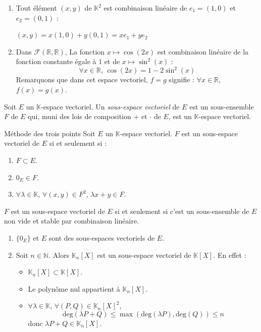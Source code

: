\documentclass[french,11pt,twoside]{VcCours}
\begin{document}
\begin{Exemples}
\begin{enumerate}
\item Tout élément $(x,y)$ de $\mathbb{K}^2$ est combinaison linéaire de $e_1=(1,0)$ et $e_2=(0,1)$ :

{$(x,y) = x(1,0)+ y(0,1)= xe_1 + y e_2$}
\item Dans $\mathcal{F}(\mathbb{R},\mathbb{R})$, La fonction $x \mapsto \cos(2x)$ est combinaison linéaire de la fonction constante égale à $1$ et de $x \mapsto \sin^2(x)$ :
$$ \forall x \in \mathbb{R}, \, \cos(2x) = 1 - 2 \sin^2(x)$$
Remarquons que dans cet espace vectoriel, $f=g$ signifie : $\forall x \in \mathbb{R}$, $f(x)=g(x)$.
\end{enumerate}
\end{Exemples}



\begin{Definition}{} Soit $E$ un $\mathbb{K}$-espace vectoriel. Un \emph{sous-espace vectoriel} de $E$ est un sous-ensemble $F$ de $E$ qui, muni  des lois de composition $+$ et $\cdot$ de $E$, est un $\mathbb{K}$-espace vectoriel.
\end{Definition}

\begin{Proposition}{Méthode des trois points}
Soit $E$ un $\mathbb{K}$-espace vectoriel. $F$ est un sous-espace vectoriel de $E$ si et seulement si :
\begin{enumerate}
\item {$F \subset E$.}
\item {$0_{E} \in F$.}
\item {$\forall \lambda \in \mathbb{K}$, $\forall (x,y) \in F^2$, $\lambda x+y \in F$.}
\end{enumerate}
\end{Proposition}

\begin{Remarque}{}
$F$ est un sous-espace vectoriel de $E$ si et seulement si c'est un sous-ensemble de $E$ non vide et stable par combinaison linéaire.
\end{Remarque}

\begin{Exemples}
\begin{enumerate}
\item $\lbrace 0_E \rbrace$ et $E$ sont des sous-espaces vectoriels de $E$.
\item Soit $n \in \mathbb{N}$. Alors $\mathbb{K}_n[X]$ est un sous-espace vectoriel de $\mathbb{K}[X]$. En effet :
\begin{itemize}
\item $\mathbb{K}_n[X] \subset \mathbb{K}[X]$.
\item Le polynôme nul appartient à $\mathbb{K}_n[X]$.
\item $\forall \lambda \in \mathbb{K}$, $\forall (P,Q) \in \mathbb{K}_n[X]^2$,
$$ \textrm{deg}(\lambda P+ Q) \leq \max (\textrm{deg}(\lambda P), \textrm{deg}(Q)) \leq n$$
donc $\lambda P + Q \in \mathbb{K}_n[X]$.
\end{itemize}
\end{enumerate}
\end{Exemples}
\end{document}

